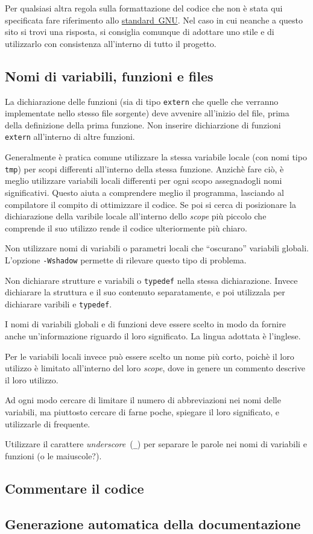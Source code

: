 \bigskip
Per qualsiasi altra regola sulla formattazione del codice che non è
stata qui specificata fare riferimento allo
\href{http://www.gnu.org/}{standard~GNU}. Nel caso in cui neanche a
questo sito si trovi una risposta, si consiglia comunque di adottare
uno stile e di utilizzarlo con consistenza all'interno di tutto il
progetto.


\subsection{Nomi di variabili, funzioni e files}

La dichiarazione delle funzioni (sia di tipo \texttt{extern} che quelle
che verranno implementate nello stesso file sorgente) deve avvenire
all'inizio del file, prima della definizione della prima funzione. Non
inserire dichiarzione di funzioni \texttt{extern} all'interno di altre
funzioni.

Generalmente è pratica comune utilizzare la stessa variabile locale
(con nomi tipo \texttt{tmp}) per scopi differenti all'interno della
stessa funzione. Anzichè fare ciò, è meglio utilizzare variabili
locali differenti per ogni scopo assegnadogli nomi
significativi. Questo aiuta a comprendere meglio il programma, lasciando
al compilatore il compito di ottimizzare il codice. Se poi si cerca di
posizionare la dichiarazione della varibile locale all'interno dello
\emph{scope} più piccolo che comprende il suo utilizzo rende il codice
ulteriormente più chiaro.

Non utilizzare nomi di variabili o parametri locali che ``oscurano''
variabili globali. L'opzione \texttt{-Wshadow} permette di rilevare
questo tipo di problema.

Non dichiarare strutture e variabili o \texttt{typedef} nella stessa
dichiarazione. Invece dichiarare la struttura e il suo contenuto
separatamente, e poi utilizzala per dichiarare varibili e
\texttt{typedef}.


\bigskip
I nomi di variabili globali e di funzioni deve essere scelto in modo
da fornire anche un'informazione riguardo il loro significato. La
lingua adottata è l'inglese.

Per le variabili locali invece può essere scelto un nome più corto,
poichè il loro utilizzo è limitato all'interno del loro \emph{scope},
dove in genere un commento descrive il loro utilizzo. 

Ad ogni modo cercare di limitare il numero di abbreviazioni nei nomi
delle variabili, ma piuttosto cercare di farne poche, spiegare il loro
significato, e utilizzarle di frequente.


\bigskip
Utilizzare il carattere \emph{underscore}~(\texttt{\_}) per separare le parole nei
nomi di variabili e funzioni (o le maiuscole?).



\subsection{Commentare il codice}

\subsection{Generazione automatica della documentazione}
